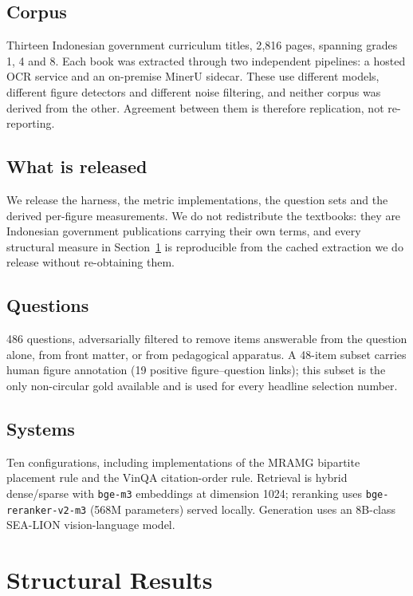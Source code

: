 \documentclass[journal]{IEEEtran}
\begin{document}
\subsection{Corpus}

Thirteen Indonesian government curriculum titles, 2{,}816 pages, spanning grades
1, 4 and 8. Each book was extracted through two independent pipelines: a hosted
OCR service and an on-premise MinerU sidecar. These use different models,
different figure detectors and different noise filtering, and neither corpus was
derived from the other. Agreement between them is therefore replication, not
re-reporting.


\subsection{What is released}

We release the harness, the metric implementations, the question sets and the
derived per-figure measurements. We do not redistribute the textbooks: they are
Indonesian government publications carrying their own terms, and every structural
measure in Section~\ref{sec:structural} is reproducible from the cached extraction
we do release without re-obtaining them.

\subsection{Questions}

486 questions, adversarially filtered to remove items answerable from the question
alone, from front matter, or from pedagogical apparatus. A 48-item subset carries
human figure annotation (19 positive figure--question links); this subset is the
only non-circular gold available and is used for every headline selection number.

\subsection{Systems}

Ten configurations, including implementations of the MRAMG bipartite placement
rule and the VinQA citation-order rule. Retrieval is hybrid dense/sparse with
\texttt{bge-m3} embeddings at dimension 1024; reranking uses
\texttt{bge-reranker-v2-m3} (568M parameters) served locally. Generation uses an
8B-class SEA-LION vision-language model.

\section{Structural Results}
\label{sec:structural}
\end{document}
